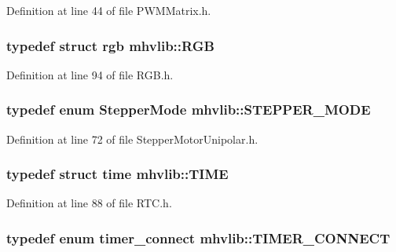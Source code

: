 Definition at line 44 of file P\-W\-M\-Matrix.\-h.

\hypertarget{namespacemhvlib_a21a85335ab93f04553238845c70477b1}{
\subsubsection[{R\-G\-B}]{\setlength{\rightskip}{0pt plus 5cm}typedef struct {\bf rgb} {\bf mhvlib\-::\-R\-G\-B}}}\label{namespacemhvlib_a21a85335ab93f04553238845c70477b1}


Definition at line 94 of file R\-G\-B.\-h.

\hypertarget{namespacemhvlib_ad1aeef32aeba87603b8d8a0ef14088b9}{
\subsubsection[{S\-T\-E\-P\-P\-E\-R\-\_\-\-M\-O\-D\-E}]{\setlength{\rightskip}{0pt plus 5cm}typedef enum {\bf Stepper\-Mode} {\bf mhvlib\-::\-S\-T\-E\-P\-P\-E\-R\-\_\-\-M\-O\-D\-E}}}\label{namespacemhvlib_ad1aeef32aeba87603b8d8a0ef14088b9}


Definition at line 72 of file Stepper\-Motor\-Unipolar.\-h.

\hypertarget{namespacemhvlib_ae8a0c3208996dd45e613708c01cbc83c}{
\subsubsection[{T\-I\-M\-E}]{\setlength{\rightskip}{0pt plus 5cm}typedef struct {\bf time} {\bf mhvlib\-::\-T\-I\-M\-E}}}\label{namespacemhvlib_ae8a0c3208996dd45e613708c01cbc83c}


Definition at line 88 of file R\-T\-C.\-h.

\hypertarget{namespacemhvlib_a670ebf781e5447de855e589e9100e224}{
\subsubsection[{T\-I\-M\-E\-R\-\_\-\-C\-O\-N\-N\-E\-C\-T}]{\setlength{\rightskip}{0pt plus 5cm}typedef enum {\bf timer\-\_\-connect} {\bf mhvlib\-::\-T\-I\-M\-E\-R\-\_\-\-C\-O\-N\-N\-E\-C\-T}}}\label{namespacemhvlib_a670ebf781e5447de855e589e9100e224}


